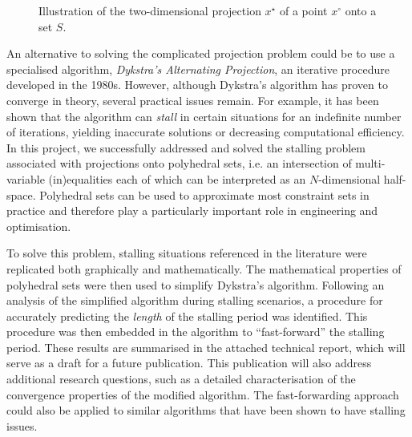 \documentclass[hidelinks]{article}
\begin{document}
\begin{figure}[!h]
\centering
{}
\caption{Illustration of the two-dimensional projection $x^\star$ of a point $x^\circ$ onto a set $S$.}\label{fig:proj}
\end{figure}

An alternative to solving the complicated projection problem could be to use a specialised algorithm, \textit{Dykstra's Alternating Projection}, an iterative procedure developed in the 1980s. However, although Dykstra's algorithm has proven to converge in theory, several practical issues remain. For example, it has been shown that the algorithm can \textit{stall} in certain situations for an indefinite number of iterations, yielding inaccurate solutions or decreasing computational efficiency. In this project, we successfully addressed and solved the stalling problem associated with projections onto polyhedral sets, i.e. an intersection of multi-variable (in)equalities each of which can be interpreted as an $N$-dimensional half-space. Polyhedral sets can be used to approximate most constraint sets in practice and therefore play a particularly important role in engineering and optimisation.

To solve this problem, stalling situations referenced in the literature were replicated both graphically and mathematically. The mathematical properties of polyhedral sets were then used to simplify Dykstra's algorithm. Following an analysis of the simplified algorithm during stalling scenarios, a procedure for accurately predicting the \textit{length} of the stalling period was identified. This procedure was then embedded in the algorithm to ``fast-forward'' the stalling period. These results are summarised in the attached technical report, which will serve as a draft for a future publication. This publication will also address additional research questions, such as a detailed characterisation of the convergence properties of the modified algorithm. The fast-forwarding approach could also be applied to similar algorithms that have been shown to have stalling issues.
\end{document}
